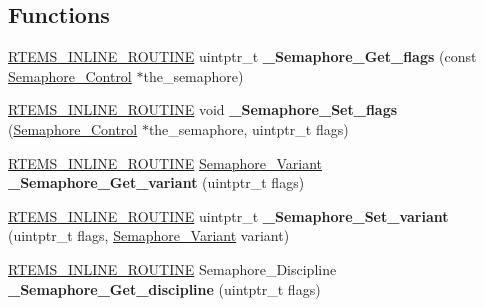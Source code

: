 \subsection*{Functions}
\begin{DoxyCompactItemize}
\item 
\mbox{\label{group__ClassicSemImpl_ga552f636ae3156648534235dea223413c}} 
\mbox{\hyperlink{group__RTEMSScoreBaseDefs_gac216239df231d5dbd15e3520b0b9313f}{R\+T\+E\+M\+S\+\_\+\+I\+N\+L\+I\+N\+E\+\_\+\+R\+O\+U\+T\+I\+NE}} uintptr\+\_\+t {\bfseries \+\_\+\+Semaphore\+\_\+\+Get\+\_\+flags} (const \mbox{\hyperlink{structSemaphore__Control}{Semaphore\+\_\+\+Control}} $\ast$the\+\_\+semaphore)
\item 
\mbox{\label{group__ClassicSemImpl_gae8dddecd1e6a752610cdfe57d63d103c}} 
\mbox{\hyperlink{group__RTEMSScoreBaseDefs_gac216239df231d5dbd15e3520b0b9313f}{R\+T\+E\+M\+S\+\_\+\+I\+N\+L\+I\+N\+E\+\_\+\+R\+O\+U\+T\+I\+NE}} void {\bfseries \+\_\+\+Semaphore\+\_\+\+Set\+\_\+flags} (\mbox{\hyperlink{structSemaphore__Control}{Semaphore\+\_\+\+Control}} $\ast$the\+\_\+semaphore, uintptr\+\_\+t flags)
\item 
\mbox{\label{group__ClassicSemImpl_ga7fc23711da0709752607f2dd1f2f8b52}} 
\mbox{\hyperlink{group__RTEMSScoreBaseDefs_gac216239df231d5dbd15e3520b0b9313f}{R\+T\+E\+M\+S\+\_\+\+I\+N\+L\+I\+N\+E\+\_\+\+R\+O\+U\+T\+I\+NE}} \mbox{\hyperlink{group__ClassicSemImpl_gab9531c36f1845c14f2dfc5006fd3dee9}{Semaphore\+\_\+\+Variant}} {\bfseries \+\_\+\+Semaphore\+\_\+\+Get\+\_\+variant} (uintptr\+\_\+t flags)
\item 
\mbox{\label{group__ClassicSemImpl_ga2ece71843f72d81fea67dd04bb5ccd25}} 
\mbox{\hyperlink{group__RTEMSScoreBaseDefs_gac216239df231d5dbd15e3520b0b9313f}{R\+T\+E\+M\+S\+\_\+\+I\+N\+L\+I\+N\+E\+\_\+\+R\+O\+U\+T\+I\+NE}} uintptr\+\_\+t {\bfseries \+\_\+\+Semaphore\+\_\+\+Set\+\_\+variant} (uintptr\+\_\+t flags, \mbox{\hyperlink{group__ClassicSemImpl_gab9531c36f1845c14f2dfc5006fd3dee9}{Semaphore\+\_\+\+Variant}} variant)
\item 
\mbox{\label{group__ClassicSemImpl_gad28b669ee7b56ee7791c8a3037bc4f20}} 
\mbox{\hyperlink{group__RTEMSScoreBaseDefs_gac216239df231d5dbd15e3520b0b9313f}{R\+T\+E\+M\+S\+\_\+\+I\+N\+L\+I\+N\+E\+\_\+\+R\+O\+U\+T\+I\+NE}} Semaphore\+\_\+\+Discipline {\bfseries \+\_\+\+Semaphore\+\_\+\+Get\+\_\+discipline} (uintptr\+\_\+t flags)

\end{DoxyCompactItemize}
